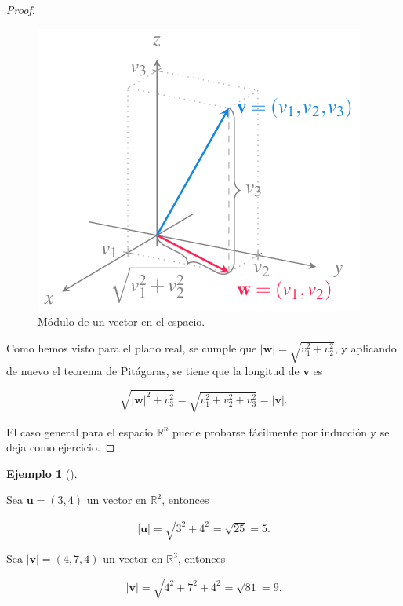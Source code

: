 \documentclass[
  a4paper,
]{scrreport}
\theoremstyle{definition}
\newtheorem{example}{Ejemplo}[chapter]
\theoremstyle{plain}
\theoremstyle{definition}
\theoremstyle{definition}
\theoremstyle{plain}
\theoremstyle{plain}
\theoremstyle{remark}
\begin{document}
\begin{tcolorbox}
\begin{proof}
\begin{figure}[H]

{\centering \includegraphics{img/geometria-plano-espacio/modulo-vector-espacio.png}

}

\caption{Módulo de un vector en el espacio.}

\end{figure}%

Como hemos visto para el plano real, se cumple que
\(|\mathbf{w}| = \sqrt{v_1^2+v_2^2}\), y aplicando de nuevo el teorema
de Pitágoras, se tiene que la longitud de \(\mathbf{v}\) es

\[
\sqrt{|\mathbf{w}|^2+v_3^2} = \sqrt{v_1^2+v_2^2+v_3^2} = |\mathbf{v}|.
\]

El caso general para el espacio \(\mathbb{R}^n\) puede probarse
fácilmente por inducción y se deja como ejercicio.
\end{proof}

\end{tcolorbox}

\begin{example}[]\protect\hypertarget{exm-modulo-vector}{}\label{exm-modulo-vector}

Sea \(\mathbf{u}=(3,4)\) un vector en \(\mathbb{R}^2\), entonces

\[
\lvert \mathbf{u} \rvert = \sqrt{3^2+4^2} = \sqrt{25} = 5.
\]

Sea \(\lvert \mathbf{v}\rvert =(4,7,4)\) un vector en \(\mathbb{R}^3\),
entonces

\[
\lvert \mathbf{v} \vert = \sqrt{4^2+7^2+4^2} = \sqrt{81} = 9.
\]

\end{example}
\end{document}
